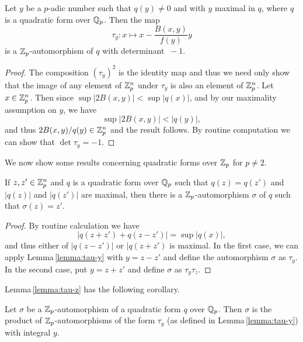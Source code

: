 \begin{lemmax}\label{lemma:tau-y} Let \(y\) be a \(p\)-adic number such that
    \(q(y) \neq 0\) and with \(y\) maximal in \(q\), where \(q\) is a quadratic
    form over \(\mathbb{Q}_p\). Then the map
    \[
       \tau_y : x \mapsto x - \frac{B(x,y)}{f(y)}y
    \]
    is a \(\mathbb{Z}_p\)-automorphism of \(q\) with determinant \(\ -1\).
\end{lemmax}

\begin{proof}
    The composition \((\tau_y)^2\) is the identity map and thus we need only
    show that the image of any element of \(\mathbb{Z}_p^n\) under \(\tau_y\) is
    also an element of \(\mathbb{Z}_p^n\). Let \(x \in \mathbb{Z}_p^n\). Then
    since \(\sup |2B(x, y)| < \sup |q(x)|\), and by our maximality assumption on
    \(y\), we have
    \[
        \sup |2B(x, y)| < |q(y)|,
    \]
    and thus \(2B(x, y)/q(y) \in \mathbb{Z}_p^n\) and the result follows. By
    routine computation we can show that \(\det \tau_y = -1\).
\end{proof}

We now show some results concerning quadratic forms over \(\mathbb{Z}_p\) for \(p
\neq 2\).

\begin{lemmax}\label{lemma:tau-z} If \(z, z' \in \mathbb{Z}_p^n\) and \(q\) is a
    quadratic form over \(\mathbb{Q}_p\) such that \(q(z) = q(z')\) and
    \(|q(z)|\) and \(|q(z')|\) are maximal, then there is a
    \(\mathbb{Z}_p\)-automorphism \(\sigma\) of \(q\) such that \(\sigma(z) =
    z'\).
\end{lemmax}

\begin{proof}
    By routine calculation we have
    \[
        |q(z + z') + q(z - z')| = \sup |q(x)|,
    \]
    and thus either of \(|q(z - z')|\) or \(|q(z + z')\) is maximal. In the
    first case, we can apply Lemma\,\ref{lemma:tau-y} with \(y = z - z'\) and
    define the automorphism \(\sigma\) as \(\tau_y\). In the second case, put
    \(y = z + z'\) and define \(\sigma\) as \(\tau_y\tau_{z}\).
\end{proof}

\medskip

Lemma\,\ref{lemma:tau-z} has the following corollary.

\begin{corollary}
    Let \(\sigma\) be a \(\mathbb{Z}_p\)-automorphism of a quadratic form \(q\)
    over \(\mathbb{Q}_p\). Then \(\sigma\) is the product of
    \(\mathbb{Z}_p\)-automorphisms of the form \(\tau_y\) (as defined in
    Lemma\,\ref{lemma:tau-y}) with integral \(y\).
\end{corollary}

